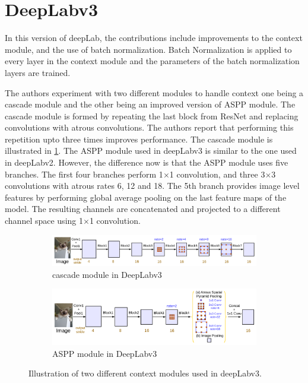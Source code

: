 \section{DeepLabv3}
In this version of deepLab, the contributions include improvements to the context module, and the use of batch normalization. Batch Normalization is applied to every layer in the context module and the parameters of the batch normalization layers are trained.

The authors experiment with two different modules to handle context one being a cascade module and the other being an improved version of ASPP module. The cascade module is formed by repeating the last block from ResNet and replacing convolutions with atrous convolutions. The authors report that performing this repetition upto three times improves performance. 	The cascade module is illustrated in \ref{Fig:contextmodulea}. The ASPP module used in deepLabv3 is similar to the one used in deepLabv2. However, the difference now is that the ASPP module uses five branches. The first four branches perform 1$\times$1 convolution, and three 3$\times$3 convolutions with atrous rates 6, 12 and 18. The 5th branch provides image level features by performing global average pooling on the last feature maps of the model. The resulting channels are concatenated and projected to a different channel space using 1$\times$1 convolution.

	\begin{figure}
		\begin{subfigure}{1\textwidth}
			\centering
			\includegraphics[width=1\linewidth]{images/cascade_module}
			\caption{cascade module in DeepLabv3}
			\label{Fig:contextmodulea}
		\end{subfigure}
		\begin{subfigure}{1\textwidth}
			\centering
			\includegraphics[width=1\linewidth]{images/aspp_module}
			\caption{ASPP module in DeepLabv3}
			\label{Fig:contextmoduleb}
		\end{subfigure}
		\caption{Illustration of two different context modules used in deepLabv3.}
		\label{Fig:contextmodule}
	\end{figure}

